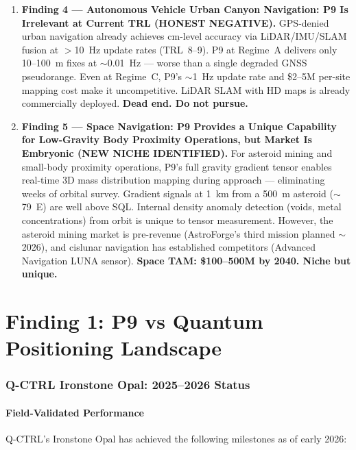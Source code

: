 \documentclass[11pt]{article}
\theoremstyle{definition}
\theoremstyle{remark}
\begin{document}
\begin{enumerate}
\item \textbf{Finding 4 --- Autonomous Vehicle Urban Canyon Navigation:
  P9 Is Irrelevant at Current TRL (HONEST NEGATIVE).}
  GPS-denied urban navigation already achieves cm-level accuracy
  via LiDAR/IMU/SLAM fusion at $>$10~Hz update rates (TRL~8--9).
  P9 at Regime~A delivers only 10--100~m fixes at $\sim$0.01~Hz ---
  worse than a single degraded GNSS pseudorange. Even at Regime~C,
  P9's $\sim$1~Hz update rate and \$2--5M per-site mapping cost
  make it uncompetitive. LiDAR SLAM with HD maps is already
  commercially deployed. \textbf{Dead end. Do not pursue.}

\item \textbf{Finding 5 --- Space Navigation: P9 Provides a Unique
  Capability for Low-Gravity Body Proximity Operations, but Market
  Is Embryonic (NEW NICHE IDENTIFIED).}
  For asteroid mining and small-body proximity operations, P9's
  full gravity gradient tensor enables real-time 3D mass distribution
  mapping during approach --- eliminating weeks of orbital survey.
  Gradient signals at 1~km from a 500~m asteroid ($\sim$79~E) are
  well above SQL. Internal density anomaly detection (voids, metal
  concentrations) from orbit is unique to tensor measurement.
  However, the asteroid mining market is pre-revenue (AstroForge's
  third mission planned $\sim$2026), and cislunar navigation has
  established competitors (Advanced Navigation LUNA sensor).
  \textbf{Space TAM: \$100--500M by 2040. Niche but unique.}
\end{enumerate}

\part{Finding 1: P9 vs Quantum Positioning Landscape}
\label{part:quantum-comparison}

\section{Q-CTRL Ironstone Opal: 2025--2026 Status}
\label{sec:qctrl-status}

\subsection{Field-Validated Performance}

Q-CTRL's Ironstone Opal has achieved the following milestones as
of early 2026:
\end{document}
